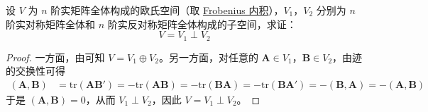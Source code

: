 \documentclass[../../main.tex]{subfiles}
\begin{document}
\begin{proposition}\label{proposition:例9.22}
设 $V$ 为 $n$ 阶实矩阵全体构成的欧氏空间（取 \hyperlink{Frobenius 内积}{Frobenius 内积}），$V_1$，$V_2$ 分别为 $n$ 阶实对称矩阵全体和 $n$ 阶实反对称矩阵全体构成的子空间，求证：
\[ V = V_1 \perp V_2 \]
\end{proposition}
\begin{proof}
一方面，由可知 $V = V_1 \oplus V_2$。另一方面，对任意的 $\boldsymbol{A} \in V_1$，$\boldsymbol{B} \in V_2$，由迹的交换性可得
\begin{align*}
(\boldsymbol{A}, \boldsymbol{B}) &= \mathrm{tr}(\boldsymbol{A}\boldsymbol{B}') = -\mathrm{tr}(\boldsymbol{A}\boldsymbol{B}) = -\mathrm{tr}(\boldsymbol{B}\boldsymbol{A}) = -\mathrm{tr}(\boldsymbol{B}\boldsymbol{A}') = -(\boldsymbol{B}, \boldsymbol{A}) = -(\boldsymbol{A}, \boldsymbol{B})
\end{align*}
于是 $(\boldsymbol{A}, \boldsymbol{B}) = 0$，从而 $V_1 \perp V_2$，因此 $V = V_1 \perp V_2$。

\end{proof}
\end{document}
